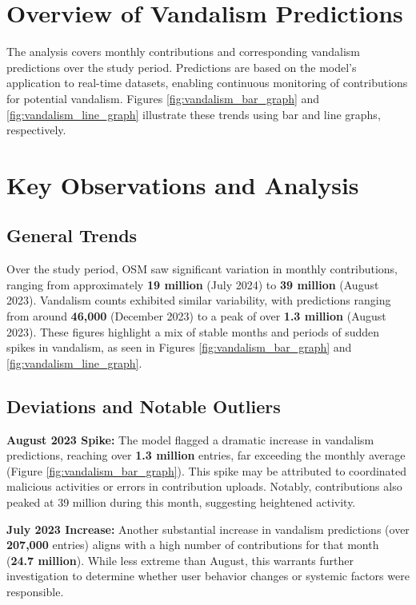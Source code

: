 \documentclass[
    13pt, %
    a4paper, %
    listof=totoc, %
    bibliography=totoc, %
    index=totoc, %
    headsepline
]{scrreprt}
\begin{document}
\section{Overview of Vandalism Predictions}
The analysis covers monthly contributions and corresponding vandalism predictions over the study period. Predictions are based on the model's application to real-time datasets, enabling continuous monitoring of contributions for potential vandalism. Figures \ref{fig:vandalism_bar_graph} and \ref{fig:vandalism_line_graph} illustrate these trends using bar and line graphs, respectively.

\section{Key Observations and Analysis}

\subsection{General Trends}
Over the study period, OSM saw significant variation in monthly contributions, ranging from approximately \textbf{19 million} (July 2024) to \textbf{39 million} (August 2023). Vandalism counts exhibited similar variability, with predictions ranging from around \textbf{46,000} (December 2023) to a peak of over \textbf{1.3 million} (August 2023). These figures highlight a mix of stable months and periods of sudden spikes in vandalism, as seen in Figures \ref{fig:vandalism_bar_graph} and \ref{fig:vandalism_line_graph}.

\subsection{Deviations and Notable Outliers}
\textbf{August 2023 Spike:} The model flagged a dramatic increase in vandalism predictions, reaching over \textbf{1.3 million} entries, far exceeding the monthly average (Figure \ref{fig:vandalism_bar_graph}). This spike may be attributed to coordinated malicious activities or errors in contribution uploads. Notably, contributions also peaked at 39 million during this month, suggesting heightened activity.

\textbf{July 2023 Increase:} Another substantial increase in vandalism predictions (over \textbf{207,000} entries) aligns with a high number of contributions for that month (\textbf{24.7 million}). While less extreme than August, this warrants further investigation to determine whether user behavior changes or systemic factors were responsible.
\end{document}
